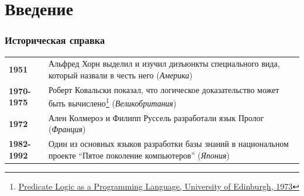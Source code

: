 \documentclass{../../slides-style}
\begin{document}
    
    \frame{\titlepage}

    \section{Введение}
    
    \begin{frame}
        \frametitle{Историческая справка}

        \begin{tabular}{m{1cm}m{10cm}}
             \textbf{1951} & Альфред Хорн выделил и изучил дизъюнкты специального вида, который назвали в честь него (\textit{Америка})\\[5mm]
             \textbf{1970-1975} &
             Роберт Ковальски показал, что логическое доказательство может быть вычислено\footnote{\href{http://www.doc.ic.ac.uk/~rak/papers/IFIP\%2074.pdf}{\footnotesize{Predicate Logic as a Programming Language, University of Edinburgh, 1973}}} (\textit{Великобритания}) \\[5mm]
             \textbf{1972} & Ален Колмероэ и Филипп Руссель разработали язык Пролог (\textit{Франция}) \\[5mm]
             \textbf{1982-1992} & Один из основных языков разработки базы знаний в национальном проекте ``Пятое поколение компьютеров'' \newline (\textit{Япония})
        \end{tabular}
    \end{frame}
\end{document}
